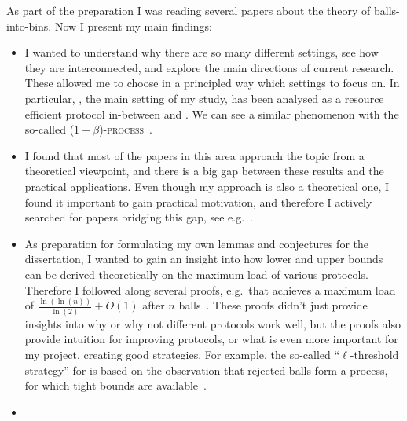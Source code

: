 
As part of the preparation I was reading several papers about the theory of balls-into-bins. Now I present my main findings: 


\begin{itemize}
    \item 
    I wanted to understand why there are so many different settings, see how they are interconnected, and explore the main directions of current research. These allowed me to choose in a principled way which settings to focus on. In particular, \TwoThinning, the main setting of my study, has been analysed as a resource efficient protocol in-between \OneChoice and \TwoChoice. We can see a similar phenomenon with the so-called \textsc{($1+\beta$)-process}~\cite{peres2015oneplusbeta}.
    \item
    I found that most of the papers in this area approach the topic from a theoretical viewpoint, and there is a big gap between these results and the practical applications. Even though my approach is also a theoretical one, I found it important to gain practical motivation, and therefore I actively searched for papers bridging this gap, see e.g.~\cite{wang2017twochoicerouting}.
    \item
    As preparation for formulating my own lemmas and conjectures for the dissertation, I wanted to gain an insight into how lower and upper bounds can be derived theoretically on the maximum load of various protocols. Therefore I followed along several proofs, e.g.\ that \TwoChoice achieves a maximum load of $\frac{\ln(\ln(n))}{\ln(2)} + O(1)$ after $n$ balls~\cite{azar1999twochoice}. These proofs didn't just provide insights into why or why not different protocols work well, but the proofs also provide intuition for improving protocols, or what is even more important for my project, creating good strategies. For example, the so-called ``{$\ell$}-threshold strategy'' for \TwoThinning is based on the observation that rejected balls form a \OneChoice process, for which tight bounds are available~\cite{feldheim2021thinning}.
    \item

\end{itemize}
